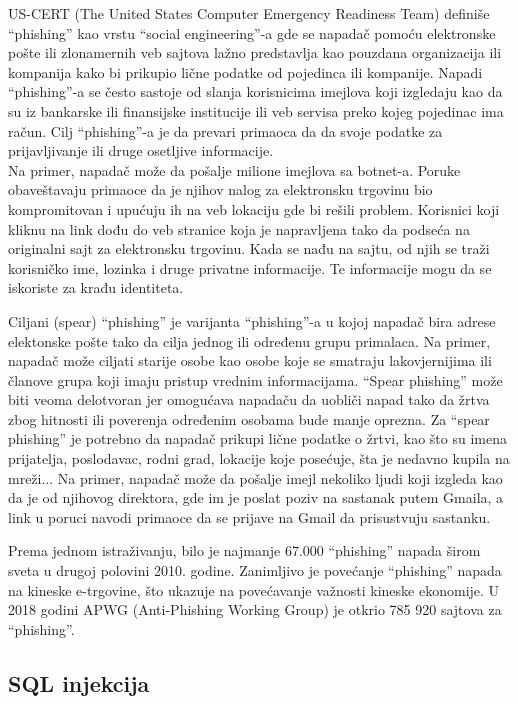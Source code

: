 \documentclass[a4paper]{article}
\begin{document}
US-CERT (The United States Computer Emergency Readiness Team) definiše “phishing” kao vrstu “social engineering”-a gde se napadač pomoću elektronske pošte ili zlonamernih veb sajtova lažno predstavlja kao pouzdana organizacija ili kompanija kako bi prikupio lične podatke od pojedinca ili kompanije. Napadi “phishing”-a se često sastoje od slanja korisnicima imejlova koji izgledaju kao da su iz bankarske ili finansijske institucije ili veb servisa preko kojeg pojedinac ima račun. Cilj “phishing”-a je da prevari primaoca da da svoje podatke za prijavljivanje ili druge osetljive informacije. 
\\Na primer, napadač može da pošalje milione imejlova sa botnet-a. Poruke obaveštavaju primaoce da je njihov nalog za elektronsku trgovinu bio kompromitovan i upućuju ih na veb lokaciju gde bi rešili problem. Korisnici koji kliknu na link dođu do veb stranice koja je napravljena tako da podseća na originalni sajt za elektronsku trgovinu. Kada se nađu na sajtu, od njih se traži korisničko ime, lozinka i druge privatne informacije. Te informacije mogu da se iskoriste za krađu identiteta.

Ciljani (spear) “phishing” je varijanta “phishing”-a u kojoj napadač bira adrese elektonske pošte tako da cilja jednog ili određenu grupu primalaca. Na primer, napadač može ciljati starije osobe kao osobe koje se smatraju lakovjernijima ili članove grupa
koji imaju pristup vrednim informacijama. “Spear phishing” može biti veoma delotvoran jer omogućava napadaču da uobliči napad tako da žrtva zbog hitnosti ili poverenja određenim osobama bude manje oprezna. Za “spear phishing” je potrebno da napadač prikupi lične podatke o žrtvi, kao što su imena prijatelja, poslodavac, rodni grad, lokacije koje posećuje, šta je nedavno kupila na mreži...
Na primer, napadač može da pošalje imejl nekoliko ljudi koji izgleda kao da je od njihovog direktora, gde im je poslat poziv na sastanak putem Gmaila, a link u poruci navodi primaoce da se prijave na Gmail da prisustvuju sastanku. 
 
Prema jednom istraživanju, bilo je najmanje 67.000 “phishing” napada širom sveta u drugoj polovini 2010. godine. Zanimljivo
je povećanje “phishing” napada na kineske e-trgovine, što ukazuje na povećavanje važnosti kineske ekonomije. U 2018 godini
APWG (Anti-Phishing Working Group) je otkrio 785 920 sajtova za “phishing”.

\subsection{SQL injekcija}
\label{subsec:sql}
\end{document}
